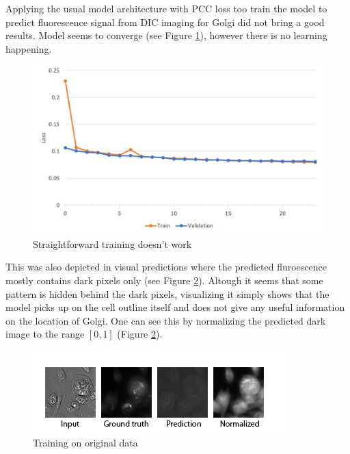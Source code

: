 Applying the usual model architecture with PCC loss too train the model to predict fluorescence signal from DIC imaging for Golgi did not bring a good results. Model seems to converge (see Figure \ref{fig:golgi-no-reg-pcc}), however there is no learning happening.
\begin{figure}[H]
	\begin{center}
		\includegraphics[width=0.5\linewidth]{bilder/golgi/pcc-no-reg.jpg}
		\caption{Straightforward training doesn't work}\label{fig:golgi-no-reg-pcc}
	\end{center}
\end{figure}

This was also depicted in visual predictions where the predicted fluroescence mostly contains dark pixels only (see Figure \ref{fig:golgi-no-reg-pcc-predictions}). Altough it seems that some pattern is hidden behind the dark pixels, visualizing it simply shows that the model picks up on the cell outline itself and does not give any useful information on the location of Golgi. One can see this by normalizing the predicted dark image to the range $[0,1]$ (Figure \ref{fig:golgi-no-reg-pcc-predictions}).
\begin{figure}[htb]
	\begin{center}
		\includegraphics[width=0.8\linewidth]{bilder/golgi/too-dark.png}
		\caption{Training on original data}\label{fig:golgi-no-reg-pcc-predictions}
	\end{center}
\end{figure}


